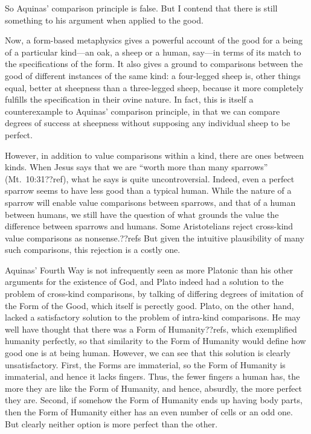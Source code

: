 So Aquinas' comparison principle is false. But I contend that there is still something to his argument
when applied to the good. 

Now, a form-based metaphysics gives a powerful account of the good for a being of
a particular kind---an oak, a sheep or a human, say---in terms of its match to the specifications of the
form. It also gives a ground to comparisons between the good of different instances of the same kind:
a four-legged sheep is, other things equal, better at sheepness than a three-legged sheep, because it
more completely fulfills the specification in their ovine nature. In fact, this is itself a counterexample 
to Aquinas' comparison principle, in that we can compare degrees of success at sheepness without supposing
any individual sheep to be perfect.

However, in addition to value comparisons within a kind, there are ones between kinds. When Jesus says
that we are ``worth more than many sparrows'' (Mt.\ 10:31??ref), what he says is quite uncontroversial.
Indeed, even a perfect sparrow seems to have less good than a typical human. While the nature of a sparrow
will enable value comparisons between sparrows, and that of a human between humans, we still have the question
of what grounds the value the difference between sparrows and humans. Some Aristotelians reject cross-kind 
value comparisons as nonsense.??refs But given the intuitive plausibility of many such comparisons, this rejection
is a costly one.

Aquinas' Fourth Way is not infrequently seen as more Platonic than his other arguments for the existence of
God, and Plato indeed had a solution to the problem of cross-kind comparisons, by talking of differing degrees
of imitation of the Form of the Good, which itself is perectly good. Plato, on the other hand, lacked a 
satisfactory solution to the problem of intra-kind comparisons. He may well have thought that there 
was a Form of Humanity??refs, which exemplified humanity perfectly, so that similarity to the Form of 
Humanity would define how good one is at being human. However,
we can see that this solution is clearly unsatisfactory. First, the Forms are immaterial, so the Form of Humanity is 
immaterial, and hence it lacks fingers. Thus, the fewer fingers a human has, the more they are like the Form of
Humanity, and hence, absurdly, the more perfect they are. Second, if somehow the Form of Humanity ends up having 
body parts, then the Form of Humanity either has an even number of cells or an odd one. But clearly neither option
is more perfect than the other. 

